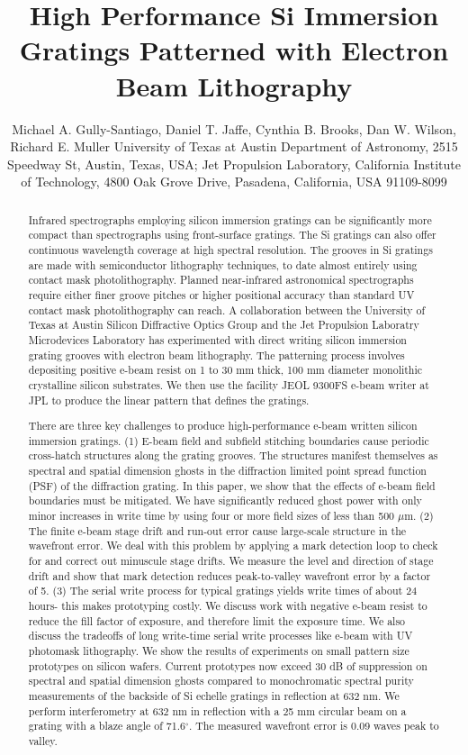 \documentclass[]{spie}  %
\title{High Performance Si Immersion Gratings Patterned with Electron Beam Lithography}
\author{Michael A. Gully-Santiago\supit{a}, Daniel T. Jaffe\supit{a}, Cynthia B. Brooks\supit{a}, Dan W. Wilson\supit{b}, Richard E. Muller\supit{b}
\skiplinehalf
\supit{a}University of Texas at Austin Department of Astronomy, 2515 Speedway St, Austin, Texas, USA; 
\skiplinehalf 
\supit{b}Jet Propulsion Laboratory, California Institute of Technology, 4800 Oak Grove Drive, Pasadena, California, USA 91109-8099
}
\begin{document}
 
  \maketitle 

\begin{abstract}
Infrared spectrographs employing silicon immersion gratings can be significantly more compact than spectrographs using front-surface gratings.  The Si gratings can also offer continuous wavelength coverage at high spectral resolution.  The grooves in Si gratings are made with semiconductor lithography techniques, to date almost entirely using contact mask photolithography.  Planned near-infrared astronomical spectrographs require either finer groove pitches or higher positional accuracy than standard UV contact mask photolithography can reach.  A collaboration between the University of Texas at Austin Silicon Diffractive Optics Group and the Jet Propulsion Laboratry Microdevices Laboratory has experimented with direct writing silicon immersion grating grooves with electron beam lithography.  The patterning process involves depositing positive e-beam resist on 1 to 30 mm thick, 100 mm diameter monolithic crystalline silicon substrates.  We then use the facility JEOL 9300FS e-beam writer at JPL to produce the linear pattern that defines the gratings.

There are three key challenges to produce high-performance e-beam written silicon immersion gratings.  (1) E-beam field and subfield stitching boundaries cause periodic cross-hatch structures along the grating grooves.   The structures manifest themselves as spectral and spatial dimension ghosts in the diffraction limited point spread function (PSF) of the diffraction grating.  In this paper, we show that the effects of e-beam field boundaries must be mitigated.  We have significantly reduced ghost power with only minor increases in write time by using four or more field sizes of less than 500 $\mu$m. (2) The finite e-beam stage drift and run-out error cause large-scale structure in the wavefront error.  We deal with this problem by applying a mark detection loop to check for and correct out minuscule stage drifts.  We measure the level and direction of stage drift and show that mark detection reduces peak-to-valley wavefront error by a factor of 5. (3) The serial write process for typical gratings yields write times of about 24 hours- this makes prototyping costly.  We discuss work with negative e-beam resist to reduce the fill factor of exposure, and therefore limit the exposure time.
We also discuss the tradeoffs of long write-time serial write processes like e-beam with UV photomask lithography.  We show the results of experiments on small pattern size prototypes on silicon wafers.  Current prototypes now exceed 30 dB of suppression on spectral and spatial dimension ghosts compared to monochromatic spectral purity measurements of the backside of Si echelle gratings in reflection at 632 nm.  We perform interferometry at 632 nm in reflection with a 25 mm circular beam on a grating with a blaze angle of 71.6$^\circ$.  The measured wavefront error is 0.09 waves peak to valley.
\end{abstract}
\end{document}
